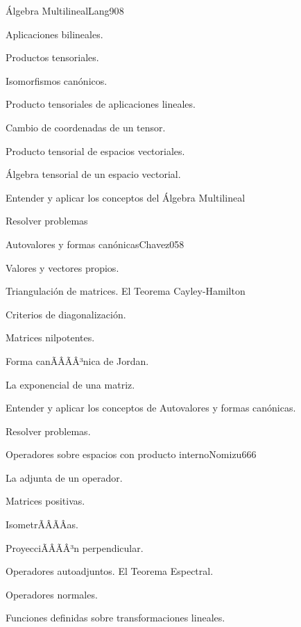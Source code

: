 \begin{sumilla}
\begin{unit}{\'Algebra Multilineal}{Lang90}{8}
   \begin{topicos}
         \item  Aplicaciones bilineales.
	 \item  Productos tensoriales.
         \item  Isomorfismos can\'onicos.
	 \item  Producto tensoriales de aplicaciones lineales.
         \item  Cambio de coordenadas de un tensor.
	 \item  Producto tensorial de espacios vectoriales.
         \item  \'Algebra tensorial de un espacio vectorial.
   \end{topicos}

   \begin{objetivos}
         \item  Entender y aplicar los conceptos del \'Algebra Multilineal
         \item  Resolver problemas
   \end{objetivos}
\end{unit}

\begin{unit}{Autovalores y formas can\'onicas}{Chavez05}{8}
   \begin{topicos}
	\item  Valores y vectores propios.
	\item  Triangulaci\'on de matrices. El Teorema Cayley-Hamilton
	\item  Criterios de diagonalizaci\'on.
	\item  Matrices nilpotentes.
	\item Forma canÃÂÃÂ³nica de Jordan.
	\item La exponencial de una matriz.
   \end{topicos}

   \begin{objetivos}
         \item  Entender y aplicar los conceptos de Autovalores y formas can\'onicas.
         \item  Resolver problemas.
   \end{objetivos}
\end{unit}

\begin{unit}{Operadores sobre espacios con producto interno}{Nomizu66}{6}
   \begin{topicos}
	\item  La adjunta de un operador.
	\item  Matrices positivas.
	\item  IsometrÃÂÃÂ­as.
	\item  ProyecciÃÂÃÂ³n perpendicular.
	\item  Operadores autoadjuntos. El Teorema Espectral.
	\item  Operadores normales.
	\item Funciones definidas sobre transformaciones lineales.
   \end{topicos}


\end{unit}
\end{sumilla}
